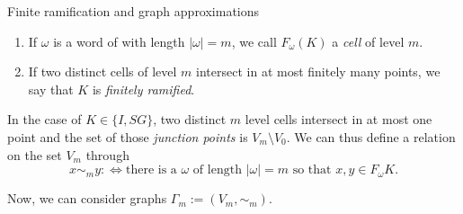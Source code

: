 \begin{frame}{Finite ramification and graph approximations}
    \begin{definition}
        \begin{enumerate}
            \item If \(\omega \) is a word of with length \(| \omega | = m \), we call \(F_\omega (K) \) a \textit{cell} of level \(m \).
            \item If two distinct cells of level \(m \) intersect in at most finitely many points, we say that \(K \) is \textit{finitely ramified}.
        \end{enumerate}
    \end{definition}

    In the case of \(K \in \{I, SG \} \), two distinct \(m \) level cells intersect in at most one point and the set of those \textit{junction points} is \(V_m \setminus V_0 \). We can thus define a relation on the set \(V_m \) through
    \[ x \sim_m y :\Leftrightarrow \text{there is a } \omega \text{ of length } | \omega | = m \text{ so that } x, y \in F_\omega K. \]

    Now, we can consider graphs \(\Gamma_m := (V_m, \sim_m) \).
\end{frame}

